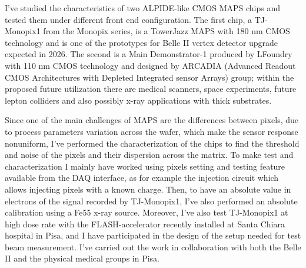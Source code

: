 \documentclass[a4paper]{report}
\begin{document}
I've studied the characteristics of two ALPIDE-like CMOS MAPS chips and tested them under different front end configuration. The first chip, a TJ-Monopix1 from the Monopix series, is a TowerJazz MAPS with 180 nm CMOS technology and is one of the prototypes for Belle II vertex detector upgrade expected in 2026. The second is a Main Demonstrator-1 produced by LFoundry with 110 nm CMOS technology and designed by ARCADIA (Advanced Readout CMOS Architectures with Depleted Integrated sensor Arrays) group; within the proposed future utilization there are medical scanners, space experiments, future lepton colliders and also possibly x-ray applications with thick substrates.  

Since one of the main challenges of MAPS are the differences between pixels, due to process parameters variation across the wafer, which make the sensor response nonuniform, I've performed the characterization of the chips to find the threshold and noise of the pixels and their dispersion across the matrix. To make test and characterization I mainly have worked using pixels setting and testing feature available from the DAQ interface, as for example the injection circuit which allows injecting pixels with a known charge. Then, to have an absolute value in electrons of the signal recorded by TJ-Monopix1, I've also performed an absolute calibration using a Fe55 x-ray source. 
Moreover, I've also test TJ-Monopix1 at high dose rate with the FLASH-accelerator recently installed at Santa Chiara hospital in Pisa, and I have participated in the design of the setup needed for test beam measurement.
I've carried out the work in collaboration with both the Belle II and the physical medical groups in Pisa.
\end{document}
